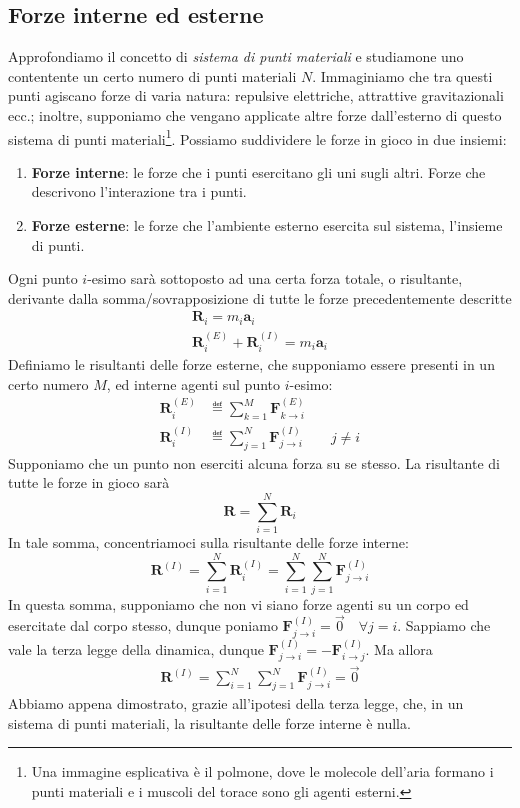 \subsection{Forze interne ed esterne}
Approfondiamo il concetto di \textit{sistema di punti materiali} e studiamone
uno contentente un certo numero di punti materiali $N$. Immaginiamo che
tra questi punti agiscano forze di varia natura: repulsive elettriche,
attrattive gravitazionali ecc.; inoltre, supponiamo che vengano applicate
altre forze dall'esterno di questo sistema di punti materiali\footnote{Una
immagine esplicativa è il polmone, dove le molecole dell'aria formano i
punti materiali e i muscoli del torace sono gli agenti esterni.}.
Possiamo suddividere le forze in gioco in due insiemi:
\begin{enumerate}
    \item \textbf{Forze interne}: le forze che i punti esercitano gli uni
    sugli altri. Forze che descrivono l'interazione tra i punti.
    \item \textbf{Forze esterne}: le forze che l'ambiente esterno esercita
    sul sistema, l'insieme di punti.
\end{enumerate}
Ogni punto $i$-esimo sarà sottoposto ad una certa forza totale, o risultante, derivante
dalla somma/sovrapposizione di tutte le forze precedentemente descritte
\begin{align*}
    \mathbf{R}_i = m_i\mathbf{a}_i\\
    \mathbf{R}^{(E)}_i + \mathbf{R}^{(I)}_i = m_i\mathbf{a}_i
\end{align*}
Definiamo le risultanti delle forze esterne, che supponiamo essere presenti
in un certo numero $M$, ed interne agenti sul punto
$i$-esimo:
\begin{align*}
    \mathbf{R}^{(E)}_i &\eqdef \sum_{k = 1}^{M} \mathbf{F}^{(E)}_{k \to i}\\
    \mathbf{R}^{(I)}_i &\eqdef \sum_{j = 1}^{N} \mathbf{F}^{(I)}_{j \to i} \qquad j \not = i
\end{align*}
Supponiamo che un punto non eserciti alcuna forza su se stesso.
La risultante di tutte le forze in gioco sarà
\[ \mathbf{R} = \sum_{i = 1}^{N} \mathbf{R}_i \]
In tale somma, concentriamoci sulla risultante delle forze interne:
\[ \mathbf{R}^{(I)} = \sum_{i = 1}^{N} \mathbf{R}^{(I)}_i = \sum_{i = 1}^{N} \sum_{j = 1}^{N} \mathbf{F}^{(I)}_{j \to i} \]
In questa somma, supponiamo che non vi siano forze agenti su un corpo
ed esercitate dal corpo stesso, dunque poniamo $\mathbf{F}^{(I)}_{j \to i} = \overrightarrow{0} \quad \forall j = i$.
Sappiamo che vale la terza legge della dinamica, dunque
$\mathbf{F}^{(I)}_{j \to i} = -\mathbf{F}^{(I)}_{i \to j}$. Ma allora
\begin{align}
    \mathbf{R}^{(I)} = \sum_{i = 1}^{N} \sum_{j = 1}^{N} \mathbf{F}^{(I)}_{j \to i} = \overrightarrow{0}\label{interne}
\end{align}
Abbiamo appena dimostrato, grazie all'ipotesi della terza legge,
che, in un sistema di punti materiali, la risultante delle forze interne
è nulla.

